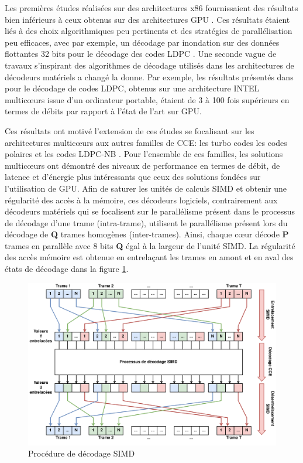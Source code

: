 \documentclass[../main.tex]{subfiles}
\begin{document}
Les premières études réalisées sur des architectures x86 fournissaient des résultats bien inférieurs à ceux obtenus sur des architectures GPU \cite{massive:gpu}. Ces résultats étaient liés à des choix algorithmiques peu pertinents et des stratégies de parallélisation peu efficaces, avec par exemple, un décodage par inondation sur des données flottantes 32 bits pour le décodage des codes LDPC \cite{Chang:ldpc}. Une seconde vague de travaux s’inspirant des algorithmes de décodage utilisés dans les architectures de décodeurs matériels a changé la donne. Par exemple, les résultats présentés dans \cite{BLG:REVUE:TPDS} pour le décodage de codes LDPC, obtenus sur une architecture INTEL multicœurs issue d’un ordinateur portable, étaient de 3 à 100 fois supérieurs en termes de débits par rapport à l’état de l’art sur GPU.

Ces résultats ont motivé l’extension de ces études se focalisant sur les architectures multicœurs aux autres familles de CCE: les turbo codes \cite{BLG:TURBO} les codes polaires \cite{ri:LeG15a,mcgill} et les codes LDPC-NB \cite{BLG:LDPC:NB}. Pour l’ensemble de ces familles, les solutions multicœurs ont démontré des niveaux de performance en termes de débit, de latence et d’énergie plus intéressants que ceux des solutions fondées sur l’utilisation de GPU.
Afin de saturer les unités de calculs SIMD et obtenir une régularité des accès à la mémoire, ces décodeurs logiciels, contrairement aux décodeurs matériels qui se focalisent sur le parallélisme présent dans le processus de décodage d’une trame (intra-trame), utilisent le parallélisme présent lors du décodage de \textbf{Q} trames homogènes (inter-trames). Ainsi, chaque cœur décode \textbf{P} trames en parallèle avec 8 bits \times \textbf{Q} égal à la largeur de l’unité SIMD. La régularité des accès mémoire est obtenue en entrelaçant les trames en amont et en aval des états de décodage dans la figure \ref{fig:simd}.

\begin{figure}
    \centering
    \includegraphics[scale=.08]{figs/SIMD.png}
    \caption{Procédure de décodage SIMD}
    \label{fig:simd}
\end{figure}
\end{document}
